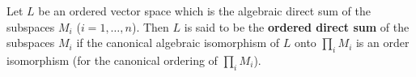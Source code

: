 Let $L$ be an ordered vector space which is the algebraic direct sum of the subspaces $M_i$ ($i = 1, \ldots, n$). Then $L$ is said to be the \textbf{ordered direct sum} of the subspaces $M_i$ if the canonical algebraic isomorphism of $L$ onto $\prod_i M_i$ is an order isomorphism (for the canonical ordering of $\prod_i M_i$).
